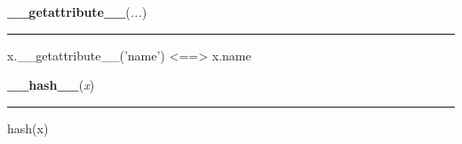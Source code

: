     \label{object:__getattribute__}

    \vspace{0.5ex}

    \begin{boxedminipage}{\textwidth}

    \raggedright \textbf{\_\_getattribute\_\_}(\textit{...})

    \vspace{-1.5ex}

    \rule{\textwidth}{0.5\fboxrule}

x.{\_}{\_}getattribute{\_}{\_}('name') {\textless}=={\textgreater} x.name
    \vspace{1ex}

    \end{boxedminipage}

    \label{object:__hash__}

    \vspace{0.5ex}

    \begin{boxedminipage}{\textwidth}

    \raggedright \textbf{\_\_hash\_\_}(\textit{x})

    \vspace{-1.5ex}

    \rule{\textwidth}{0.5\fboxrule}

hash(x)
    \vspace{1ex}

    \end{boxedminipage}

    \vspace{0.5ex}

